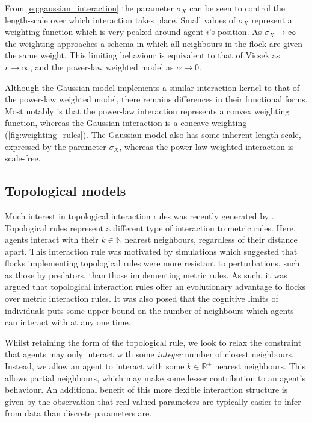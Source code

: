 From \cref{eq:gaussian_interaction} the parameter $\sigma_X$ can be seen to
control the length-scale over which interaction takes place. Small values of
$\sigma_X$ represent a weighting function which is very peaked around agent
$i$'s position. As $\sigma_X \rightarrow \infty$ the weighting approaches a
schema in which all neighbours in the flock are given the same weight. This
limiting behaviour is equivalent to that of Vicsek as $r\rightarrow\infty$, and
the power-law weighted model as $\alpha\rightarrow0$.

Although the Gaussian model implements a similar interaction kernel to that of
the power-law weighted model, there remains differences in their functional
forms. Most notably is that the power-law interaction represents a convex
weighting function, whereas the Gaussian interaction is a concave weighting
(\cref{fig:weighting_rules}). The Gaussian model also has some inherent length
scale, expressed by the parameter $\sigma_X$, whereas the power-law weighted
interaction is scale-free.

\subsection{Topological models}

Much interest in topological interaction rules was recently generated by
\cite{ballerini08}. Topological rules represent a different type of interaction
to metric rules. Here, agents interact with their $k\in\mathbb{N}$ nearest
neighbours, regardless of their distance apart. This interaction rule was
motivated by simulations which suggested that flocks implementing topological
rules were more resistant to perturbations, such as those by predators, than
those implementing metric rules. As such, it was argued that topological
interaction rules offer an evolutionary advantage to flocks over metric
interaction rules. It was also posed that the cognitive limits of individuals
puts some upper bound on the number of neighbours which agents can interact
with at any one time.

Whilst retaining the form of the topological rule, we look to relax the
constraint that agents may only interact with some \emph{integer} number of
closest neighbours. Instead, we allow an agent to interact with some
$k\in\mathbb{R}^+$ nearest neighbours. This allows partial neighbours, which
may make some lesser contribution to an agent's behaviour. An additional
benefit of this more flexible interaction structure is given by the observation
that real-valued parameters are typically easier to infer from data than
discrete parameters are.

